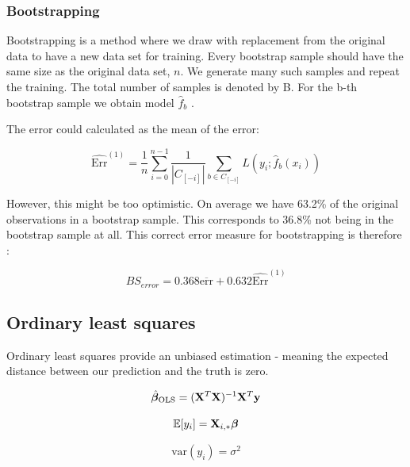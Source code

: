 \subsubsection{Bootstrapping}
Bootstrapping is a method where we draw with replacement from the original data to have a new data set for training. Every bootstrap sample should have the same size as the original data set, $n$. We generate many such samples and repeat the training. The total number of samples is denoted by B.
For the b-th bootstrap sample we obtain model $\hat{f}_b$ \citep[p. 249]{hastie}.

The error could calculated as the mean of the error:

\begin{equation}
    \widehat{\text{Err}}^{(1)} = \frac{1}{n} \sum_{i=0}^{n-1} \frac{1}{|C_{[-i]}|} \sum_{b \in C_{[-i]}} L\left(y_i; \hat{f}_b(x_i)\right)
\end{equation}

However, this might be too optimistic. On average we have 63.2\% of the original observations in a bootstrap sample. This corresponds to 36.8\% not being in the bootstrap sample at all.  This correct error measure for bootstrapping is therefore \citep[p. 251]{hastie}: 

\begin{equation}
    BS_{error} = 0.368 \overline{\text{err}} + 0.632 \widehat{\text{Err}}^{(1)}
\end{equation}


\subsection{Ordinary least squares}
Ordinary least squares provide an unbiased estimation - meaning the expected distance between our prediction and the truth is zero. 

\begin{equation}\label{betaols}
    \hat{\boldsymbol{\beta}}_{\text{OLS}} = (\mathbf{X}^T\mathbf{X})^{-1}\mathbf{X}^T\mathbf{y}
\end{equation}

\begin{equation}
    \mathbb{E}[y_i] = \mathbf{X}_{i,*}\boldsymbol{\beta}
\end{equation}

\begin{equation}
    \text{var}(y_i) = \sigma^2
\end{equation}

